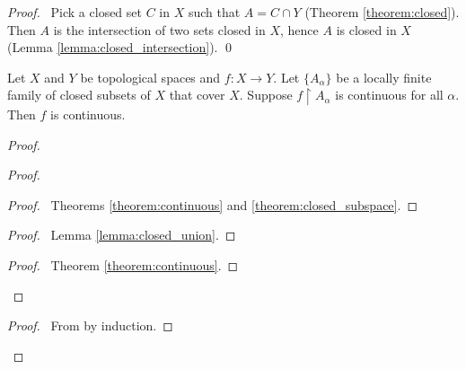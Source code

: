 \begin{proof}
    \pf\ Pick a closed set $C$ in $X$ such that $A = C \cap Y$ (Theorem \ref{theorem:closed}). Then
    $A$ is the intersection of two sets closed in $X$, hence $A$ is closed in $X$ (Lemma \ref{lemma:closed_intersection}). \qed
\end{proof}

\begin{theorem}
    Let $X$ and $Y$ be topological spaces and $f : X \rightarrow Y$. Let $\{ A_\alpha \}$ be a locally finite family of closed subsets of $X$ that cover $X$. Suppose $f \restriction A_\alpha$
    is continuous for all $\alpha$. Then $f$ is continuous.
\end{theorem}

\begin{proof}
    \pf
    \begin{proof}
        \begin{proof}
            \pf\ Theorems \ref{theorem:continuous} and \ref{theorem:closed_subspace}.
        \end{proof}
        \begin{proof}
            \pf\ Lemma \ref{lemma:closed_union}.
        \end{proof}
        \qedstep
        \begin{proof}
            \pf\ Theorem \ref{theorem:continuous}.
        \end{proof}    
    \end{proof}
    \begin{proof}
        \pf\ From  by induction.
    \end{proof}
\end{proof}
